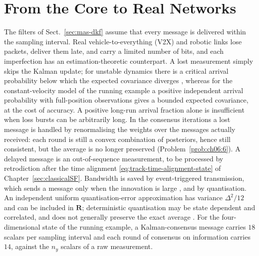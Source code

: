 \section{From the Core to Real Networks}
\label{sec:mas-real-networks}

The filters of Sect.~\ref{sec:mas-dkf} assume that every message is delivered within the sampling interval. Real vehicle-to-everything (V2X) and robotic links lose packets, deliver them late, and carry a limited number of bits, and each imperfection has an estimation-theoretic counterpart. A lost measurement simply skips the Kalman update; for unstable dynamics there is a critical arrival probability below which the expected covariance diverges \cite{sinopoli2004_intermittent}, whereas for the constant-velocity model of the running example a positive independent arrival probability with full-position observations gives a bounded expected covariance, at the cost of accuracy. A positive long-run arrival fraction alone is insufficient when loss bursts can be arbitrarily long. In the consensus iterations a lost message is handled by renormalising the weights over the messages actually received: each round is still a convex combination of posteriors, hence still consistent, but the average is no longer preserved (Problem~\ref{prob:ch06:6}). A delayed message is an out-of-sequence measurement, to be processed by retrodiction \cite{barshalom2002_oosm} after the time alignment \eqref{eq:track-time-alignment-state} of Chapter~\ref{sec:classicalSF}. Bandwidth is saved by event-triggered transmission, which sends a message only when the innovation is large \cite{trimpe2014_event_based}, and by quantisation. An independent uniform quantisation-error approximation has variance $\Delta^2/12$ and can be included in $\mathbf{R}$; deterministic quantisation may be state dependent and correlated, and does not generally preserve the exact average \cite{kashyap2007_quantized}. For the four-dimensional state of the running example, a Kalman-consensus message carries $18$ scalars per sampling interval and each round of consensus on information carries $14$, against the $n_y$ scalars of a raw measurement.

